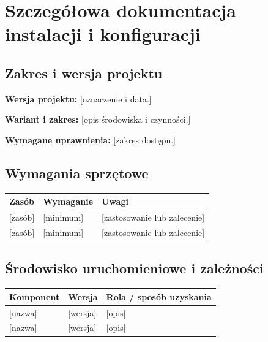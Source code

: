 \documentclass[11pt,a4paper,oneside]{article}
\newif\ifpodpowiedzi
\newcommand{\podpowiedz}[1]{\ifpodpowiedzi\par\begingroup\small\color{hintcolor}\textit{Wskazówka: #1}\par\endgroup\fi}
\newcommand{\pole}[1]{\textnormal{[#1]}}
\begin{document}
\section{Szczegółowa dokumentacja instalacji i konfiguracji}
\subsection{Zakres i wersja projektu}
\podpowiedz{Podaj wersję projektu, której dotyczy instrukcja, oraz opisany wariant wdrożenia, np. lokalny, serwerowy, kontenerowy lub na urządzeniu. Wskaż, czy instrukcja obejmuje uruchomienie gotowego rezultatu, odtworzenie go z plików źródłowych, czy oba warianty. Opisz wymaganą wiedzę i uprawnienia osoby wykonującej czynności.}
\textbf{Wersja projektu:} \pole{oznaczenie i data.}\par
\textbf{Wariant i zakres:} \pole{opis środowiska i czynności.}\par
\textbf{Wymagane uprawnienia:} \pole{zakres dostępu.}

\newpage
\subsection{Wymagania sprzętowe}
\podpowiedz{Podaj minimalne zasoby potrzebne do działania projektu: procesor, pamięć RAM, miejsce na dysku, GPU, urządzenia i połączenia sieciowe, o ile mają znaczenie. Rozróżnij wymagania do uruchomienia oraz budowania, renderowania lub innych prac, jeśli są różne. Wskazuj wymagania sprawdzone albo wyraźnie oznacz szacunki.}
\begin{tabularx}{\textwidth}{@{}l Y Y@{}}
\toprule
Zasób & Wymaganie & Uwagi\\
\midrule
\pole{zasób} & \pole{minimum} & \pole{zastosowanie lub zalecenie}\\
\pole{zasób} & \pole{minimum} & \pole{zastosowanie lub zalecenie}\\
\bottomrule
\end{tabularx}

\subsection{Środowisko uruchomieniowe i zależności}
\podpowiedz{Wymień system operacyjny, środowiska uruchomieniowe, narzędzia, biblioteki i usługi wraz ze sprawdzonymi wersjami. Uwzględnij bazę danych, kontenery, oprogramowanie specjalistyczne i wtyczki, jeśli występują. Podaj pliki określające zależności oraz sposób ich instalacji. Wskaż wymagany dostęp do sieci lub usług zewnętrznych.}
\begin{tabularx}{\textwidth}{@{}Y l Y@{}}
\toprule
Komponent & Wersja & Rola / sposób uzyskania\\
\midrule
\pole{nazwa} & \pole{wersja} & \pole{opis}\\
\pole{nazwa} & \pole{wersja} & \pole{opis}\\
\bottomrule
\end{tabularx}
\end{document}
